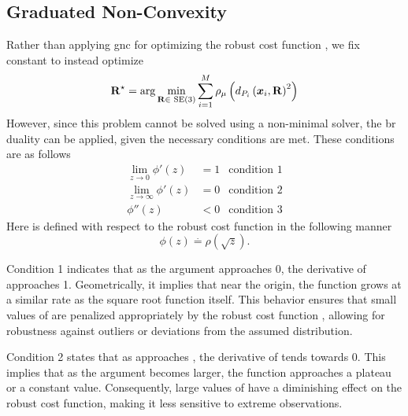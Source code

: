 


\subsection{Graduated Non-Convexity}\label{subs:2-pose-estimation-graduated-non-convexity}

Rather than applying \gls{gnc} for optimizing the robust cost function \mvar{\rho(\cdot)}, we fix constant \mvar{\mu} to instead optimize
%
\begin{equation}
	\tf[R]{\star}{}=\arg \min_{\mat{R}\in\SE (3)} \sum^M_{i=1} \rho_\mu \left(d_{P_i}\left(\vec{x}_i, \mat{R} \right)^{2}\right)
\end{equation}
However, since this problem cannot be solved using a non-minimal solver, the \gls{br} duality can be applied, given the necessary conditions are met. These conditions are as follows
%
\begin{align}\label{eq:br-condition-1-2-3}
	\lim_{z\rightarrow 0} \phi'(z) &= 1 & \text{condition 1} \\
	\lim_{z\rightarrow \infty}\phi'(z) &= 0 & \text{condition 2} \\
	\phi''(z) &< 0 & \text{condition 3}
\end{align}
Here  is defined with respect to the robust cost function \mvar{\rho} in the following manner
%
\begin{equation}
	\phi(z) \overset{\cdot}{=} \rho(\sqrt{z}).
\end{equation}

Condition 1 indicates that as the argument  approaches \num{0}, the derivative of  approaches \num{1}. Geometrically, it implies that near the origin, the function  grows at a similar rate as the square root function itself. This behavior ensures that small values of  are penalized appropriately by the robust cost function \mvar{\rho(\cdot)}, allowing for robustness against outliers or deviations from the assumed distribution. \medskip

Condition 2 states that as  approaches \mvar{\infty}, the derivative of  tends towards \num{0}. This implies that as the argument becomes larger, the function  approaches a plateau or a constant value. Consequently, large values of  have a diminishing effect on the robust cost function, making it less sensitive to extreme observations. \medskip

